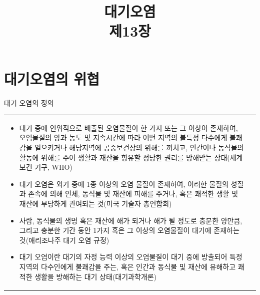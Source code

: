 \title[]{대기오염\\\small{제13장}}

\begin{frame}[plain] %
	\titlepage
\end{frame}


\section{대기오염의 위협}


\begin{frame}[t]{대기 오염의 정의}
	\begin{tabular}{ll}
		\begin{minipage}[t]{0.94\textwidth}\scriptsize
			\begin{itemize}
				\item 대기 중에 인위적으로 배출된 오염물질이 한 가지 또는 그 이상이 존재하여, 오염물질의 양과 농도 및 지속시간에 따라 어떤 지역의 불특정 다수에게 불쾌감을 일으키거나 해당지역에 공중보건상의 위해를 끼치고, 인간이나 동식물의 활동에 위해를 주어 생활과 재산을 향유할 정당한 권리를 방해받는 상태(세계보건 기구, WHO)
				\item 대기 오염은 외기 중에 1종 이상의 오염 물질이 존재하여, 이러한 물질의 성질과 존속에 의해 인체, 동식물 및 재산에 피해를 주거나, 혹은 쾌적한 생활 및 재산에 부당하게 관여되는 것(미국 기술자 총연합회)
				\item 사람, 동식물의 생명 혹은 재산에 해가 되거나 해가 될 정도로 충분한 양만큼, 그리고 충분한 기간 동안 1가지 혹은 그 이상의 오염물질이 대기에 존재하는 것(애리조나주 대기 오염 규정)
				\item 대기 오염이란 대기의 자정 능력 이상의 오염물질이 대기 중에 방출되어 특정 지역의 다수인에게 불쾌감을 주는, 혹은 인간과 동식물 및 재산에 유해하고 쾌적한 생활을 방해하는 대기 상태(대기과학개론)
			\end{itemize}

		\end{minipage}	
		&
		\begin{minipage}[t]{0.01\textwidth} \scriptsize	
			
		\end{minipage}
	\end{tabular}
\end{frame}



